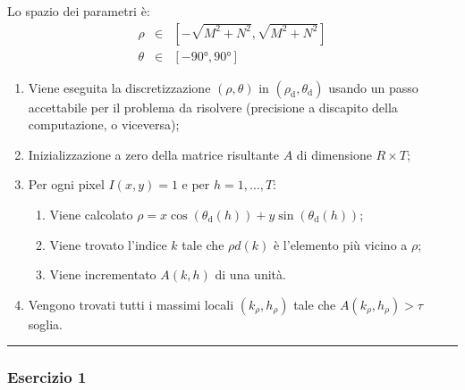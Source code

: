 \documentclass[a4paper]{article}
\newcommand{\longline}{\noindent\rule{\textwidth}{0.4pt}}
\begin{document}
	\noindent
	Lo spazio dei parametri è:
	\begin{equation*}
		\begin{array}{lll}
			\rho &\in& \left[-\sqrt{M^{2} + N^{2}}, \sqrt{M^{2} + N^{2}}\right] \\
			\theta &\in& \left[-90°, 90°\right]
		\end{array}
	\end{equation*}
	\begin{enumerate}
		\item Viene eseguita la discretizzazione $\left(\rho,\theta\right)$ in $\left(\rho_{\mathrm{d}}, \theta_{\mathrm{d}}\right)$ usando un passo accettabile per il problema da risolvere (precisione a discapito della computazione, o viceversa);
		
		\item Inizializzazione a zero della matrice risultante $A$ di dimensione $R \times T$;
		
		\item Per ogni pixel $I\left(x,y\right) = 1$ e per $h = 1, ..., T$:
		\begin{enumerate}
			\item Viene calcolato $\rho = x \cos\left(\theta_{\mathrm{d}}\left(h\right)\right) + y \sin\left(\theta_{\mathrm{d}}\left(h\right)\right)$;
			
			\item Viene trovato l'indice $k$ tale che $\rho d\left(k\right)$ è l'elemento più vicino a $\rho$;
			
			\item Viene incrementato $A\left(k,h\right)$ di una unità.
		\end{enumerate}
		
		\item Vengono trovati tutti i massimi locali $\left(k_{\rho}, h_{\rho}\right)$ tale che $A\left(k_{\rho}, h_{\rho}\right) > \tau$ soglia.
	\end{enumerate}
	
	\longline
	
	\subsubsection{Esercizio 1}
	
\end{document}
